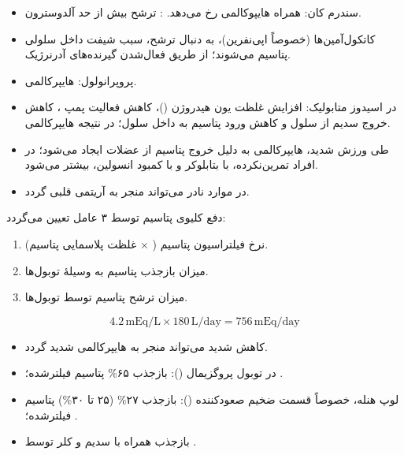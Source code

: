 \documentclass[11pt,a4paper]{article}
\begin{document}
\begin{itemize}
\item سندرم کان: همراه هایپوکالمی رخ می‌دهد. : ترشح بیش از حد آلدوسترون.
\item کاتکول‌آمین‌ها (خصوصاً اپی‌نفرین)، به دنبال ترشح، سبب شیفت داخل سلولی پتاسیم می‌شوند؛ از طریق فعال‌شدن گیرنده‌های  آدرنرژیک.
\item پروپرانولول: هایپرکالمی.
\item در اسیدوز متابولیک: افزایش غلظت یون هیدروژن ()، کاهش فعالیت پمپ ، کاهش خروج سدیم از سلول و کاهش ورود پتاسیم به داخل سلول؛ در نتیجه هایپرکالمی.
\item طی ورزش شدید، هایپرکالمی به دلیل خروج پتاسیم از عضلات ایجاد می‌شود؛ در افراد تمرین‌نکرده، با بتابلوکر و با کمبود انسولین، بیشتر می‌شود.
\item در موارد نادر می‌تواند منجر به آریتمی قلبی گردد.
\end{itemize}
دفع کلیوی پتاسیم توسط ۳ عامل تعیین می‌گردد:
\begin{enumerate}
\item نرخ فیلتراسیون پتاسیم ( \(\times\) غلظت پلاسمایی پتاسیم).
\item میزان بازجذب پتاسیم به وسیلهٔ توبول‌ها.
\item میزان ترشح پتاسیم توسط توبول‌ها.
\end{enumerate}
\begin{equation*}
4.2\,\mathrm{mEq/L}\times180\,\mathrm{L/day}=756\,\mathrm{mEq/day}
\end{equation*}
\begin{itemize}
\item کاهش شدید  می‌تواند منجر به هایپرکالمی شدید گردد.
\item در توبول پروگزیمال (): بازجذب ۶۵\% پتاسیم فیلترشده؛ .
\item لوپ هنله، خصوصاً قسمت ضخیم صعودکننده (): بازجذب ۲۷\% (۲۵ تا ۳۰\%) پتاسیم فیلترشده؛ .
\item بازجذب همراه با سدیم و کلر توسط .
\end{itemize}
\end{document}
